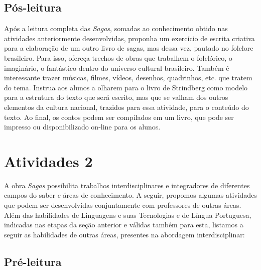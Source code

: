 \documentclass{extarticle}
\begin{document}
\subsection{Pós-leitura}


Após a leitura completa das \emph{Sagas}, somadas ao
conhecimento obtido nas atividades anteriormente desenvolvidas, proponha
um exercício de escrita criativa para a elaboração de um outro livro de
sagas, mas dessa vez, pautado no folclore brasileiro. Para isso, ofereça
trechos de obras que trabalhem o folclórico, o imaginário, o fantástico
dentro do universo cultural brasileiro. Também é interessante trazer
músicas, filmes, vídeos, desenhos, quadrinhos, etc. que tratem do tema.
Instrua aos alunos a olharem para o livro de Strindberg como modelo para
a estrutura do texto que será escrito, mas que se valham dos outros
elementos da cultura nacional, trazidos para essa atividade, para o
conteúdo do texto. Ao final, os contos podem ser compilados em um livro,
que pode ser impresso ou disponibilizado on-line para os alunos.


\section{Atividades 2}


A obra \emph{Sagas} possibilita trabalhos interdisciplinares e
integradores de diferentes campos do saber e áreas de conhecimento. A
seguir, propomos algumas atividades que podem ser desenvolvidas
conjuntamente com professores de outras áreas. Além das habilidades de
Linguagens e suas Tecnologias e de Língua Portuguesa, indicadas nas
etapas da seção anterior e válidas também para esta, listamos a seguir
as habilidades de outras áreas, presentes na abordagem interdisciplinar:

\subsection{Pré-leitura}
\end{document}
